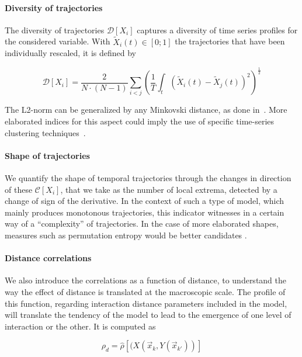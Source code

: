 \paragraph{Diversity of trajectories}

The diversity of trajectories $\mathcal{D}\left[X_i\right]$ captures a diversity of time series profiles for the considered variable. With $\tilde{X}_i(t)\in \left[0;1\right]$ the trajectories that have been individually rescaled, it is defined by

\begin{equation}
\mathcal{D}\left[X_i\right] = \frac{2}{N\cdot(N-1)}\sum_{i<j} \left(\frac{1}{T}\int_{t} \left(\tilde{X}_i(t) - \tilde{X}_j(t)\right)^2 \right)^{\frac{1}{2}}
\end{equation}

The L2-norm can be generalized by any Minkovski distance, as done in~\cite{raimbault2016hybrid}. More elaborated indices for this aspect could imply the use of specific time-series clustering techniques~\cite{liao2005clustering}.


\paragraph{Shape of trajectories}

We quantify the shape of temporal trajectories through the changes in direction of these $\mathcal{C}\left[X_i\right]$, that we take as the number of local extrema, detected by a change of sign of the derivative. In the context of such a type of model, which mainly produces monotonous trajectories, this indicator witnesses in a certain way of a ``complexity'' of trajectories. In the case of more elaborated shapes, measures such as permutation entropy would be better candidates \cite{scarpino2017predictability}.
	
	
\paragraph{Distance correlations}

We also introduce the correlations as a function of distance, to understand the way the effect of distance is translated at the macroscopic scale. The profile of this function, regarding interaction distance parameters included in the model, will translate the tendency of the model to lead to the emergence of one level of interaction or the other. It is computed as

\begin{equation}
\rho_d = \hat{\rho}\left[(X(\vec{x}_k,Y(\vec{x}_{k'}))\right]
\end{equation}

